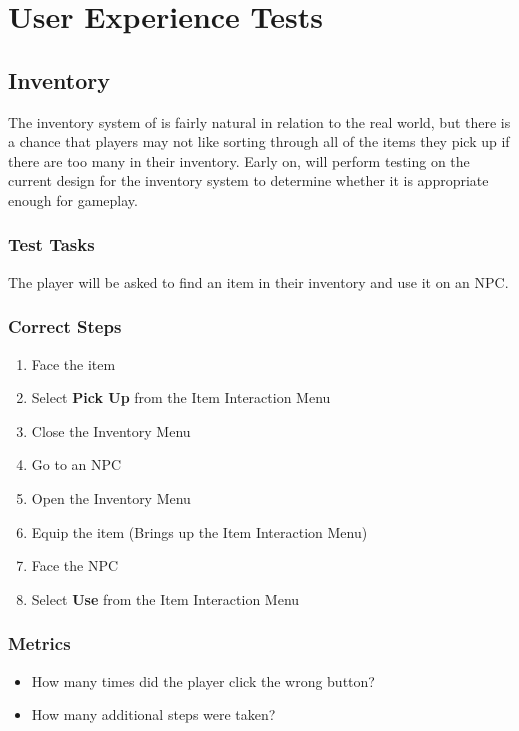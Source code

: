 \section{User Experience Tests}
\subsection{Inventory}
The inventory system of \ourgame{} is fairly natural in relation to the real world, but there is a chance that players may not like sorting through all of the items they pick up if there are too many in their inventory. Early on, \ourteam{} will perform testing on the current design for the inventory system to determine whether it is appropriate enough for gameplay.

\subsubsection{Test Tasks}
The player will be asked to find an item in their inventory and use it on an NPC.

\subsubsection{Correct Steps}
\begin{enumerate}
\item{Face the item}
\item{Select \textbf{Pick Up} from the Item Interaction Menu}
\item{Close the Inventory Menu}
\item{Go to an NPC}
\item{Open the Inventory Menu}
\item{Equip the item (Brings up the Item Interaction Menu)}
\item{Face the NPC}
\item{Select \textbf{Use} from the Item Interaction Menu}
\end{enumerate}

\subsubsection{Metrics}
\begin{itemize}
\item{How many times did the player click the wrong button?}
\item{How many additional steps were taken?}
\end{itemize}




